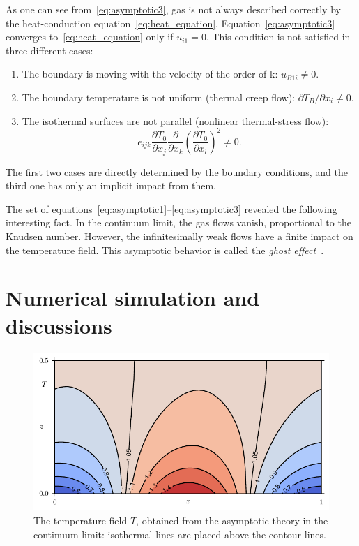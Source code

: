 \documentclass[smallextended, referee]{svjour3} %
\newcommand{\pder}[2][]{\frac{\partial#1}{\partial#2}}
\newcommand{\Pder}[2][]{\partial#1/\partial#2}
\begin{document}
As one can see from~\eqref{eq:asymptotic3}, gas is not always described correctly
by the heat-conduction equation~\eqref{eq:heat_equation}.
Equation~\eqref{eq:asymptotic3} converges to~\eqref{eq:heat_equation} only if \(u_{i1} = 0\).
This condition is not satisfied in three different cases:
\begin{enumerate}
	\item The boundary is moving with the velocity of the order of k: \(u_{B1i} \neq 0 \).
	\item The boundary temperature is not uniform (thermal creep flow): \(\Pder[T_B]{x_i} \neq 0 \).
	\item The isothermal surfaces are not parallel (nonlinear thermal-stress flow):
		\begin{equation}\label{eq:equilibrium}
			e_{ijk}\pder[T_0]{x_j}\pder{x_k}\left(\pder[T_0]{x_l}\right)^2 \neq 0.
		\end{equation}
\end{enumerate}

The first two cases are directly determined by the boundary conditions,
and the third one has only an implicit impact from them.

The set of equations~\eqref{eq:asymptotic1}--\eqref{eq:asymptotic3} revealed the following interesting fact.
In the continuum limit, the gas flows vanish, proportional to the Knudsen number.
However, the infinitesimally weak flows have a finite impact on the temperature field.
This asymptotic behavior is called the \emph{ghost effect}~\cite{GhostEffect, Sone2002, Sone2007}.

\section{Numerical simulation and discussions}

\begin{figure}[ht]
	\centering
	\includegraphics{Fig3}
	\caption{The temperature field \(T\), obtained from the asymptotic theory in the continuum limit:
		isothermal lines are placed above the contour lines.}
	\label{fig:moving:T_asym}
\end{figure}
\end{document}
